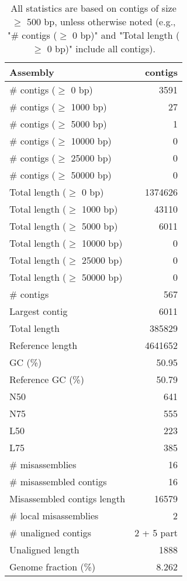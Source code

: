 \documentclass[12pt,a4paper]{article}
\begin{document}
\begin{table}[ht]
\begin{center}
\caption{All statistics are based on contigs of size $\geq$ 500 bp, unless otherwise noted (e.g., "\# contigs ($\geq$ 0 bp)" and "Total length ($\geq$ 0 bp)" include all contigs).}
\begin{tabular}{|l*{1}{|r}|}
\hline
Assembly & contigs \\ \hline
\# contigs ($\geq$ 0 bp) & 3591 \\ \hline
\# contigs ($\geq$ 1000 bp) & 27 \\ \hline
\# contigs ($\geq$ 5000 bp) & 1 \\ \hline
\# contigs ($\geq$ 10000 bp) & 0 \\ \hline
\# contigs ($\geq$ 25000 bp) & 0 \\ \hline
\# contigs ($\geq$ 50000 bp) & 0 \\ \hline
Total length ($\geq$ 0 bp) & 1374626 \\ \hline
Total length ($\geq$ 1000 bp) & 43110 \\ \hline
Total length ($\geq$ 5000 bp) & 6011 \\ \hline
Total length ($\geq$ 10000 bp) & 0 \\ \hline
Total length ($\geq$ 25000 bp) & 0 \\ \hline
Total length ($\geq$ 50000 bp) & 0 \\ \hline
\# contigs & 567 \\ \hline
Largest contig & 6011 \\ \hline
Total length & 385829 \\ \hline
Reference length & 4641652 \\ \hline
GC (\%) & 50.95 \\ \hline
Reference GC (\%) & 50.79 \\ \hline
N50 & 641 \\ \hline
N75 & 555 \\ \hline
L50 & 223 \\ \hline
L75 & 385 \\ \hline
\# misassemblies & 16 \\ \hline
\# misassembled contigs & 16 \\ \hline
Misassembled contigs length & 16579 \\ \hline
\# local misassemblies & 2 \\ \hline
\# unaligned contigs & 2 + 5 part \\ \hline
Unaligned length & 1888 \\ \hline
Genome fraction (\%) & 8.262 \\ \hline

\end{tabular}
\end{center}
\end{table}
\end{document}
